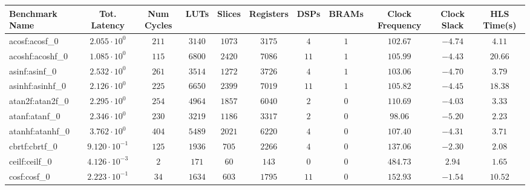 \begin{tabular}{|l|c|c|c|c|c|c|c|c|c|c|}
\hline
Benchmark Name               & Tot. Latency            & Num Cycles & LUTs       & Slices    & Registers  & DSPs    & BRAMs & Clock Frequency & Clock Slack & HLS Time(s) \\
\hline
acosf:acosf\_0               & $ 2.055 \cdot 10^{0}  $ & $ 211    $ & $ 3140   $ & $ 1073  $ & $ 3175   $ & $ 4   $ & $ 1 $ & $ 102.67      $ & $ -4.74   $ & $ 4.11    $ \\
acoshf:acoshf\_0             & $ 1.085 \cdot 10^{0}  $ & $ 115    $ & $ 6800   $ & $ 2420  $ & $ 7086   $ & $ 11  $ & $ 1 $ & $ 105.99      $ & $ -4.43   $ & $ 20.66   $ \\
asinf:asinf\_0               & $ 2.532 \cdot 10^{0}  $ & $ 261    $ & $ 3514   $ & $ 1272  $ & $ 3726   $ & $ 4   $ & $ 1 $ & $ 103.06      $ & $ -4.70   $ & $ 3.79    $ \\
asinhf:asinhf\_0             & $ 2.126 \cdot 10^{0}  $ & $ 225    $ & $ 6650   $ & $ 2399  $ & $ 7019   $ & $ 11  $ & $ 1 $ & $ 105.82      $ & $ -4.45   $ & $ 18.38   $ \\
atan2f:atan2f\_0             & $ 2.295 \cdot 10^{0}  $ & $ 254    $ & $ 4964   $ & $ 1857  $ & $ 6040   $ & $ 2   $ & $ 0 $ & $ 110.69      $ & $ -4.03   $ & $ 3.33    $ \\
atanf:atanf\_0               & $ 2.346 \cdot 10^{0}  $ & $ 230    $ & $ 3219   $ & $ 1186  $ & $ 3317   $ & $ 2   $ & $ 0 $ & $ 98.06       $ & $ -5.20   $ & $ 2.23    $ \\
atanhf:atanhf\_0             & $ 3.762 \cdot 10^{0}  $ & $ 404    $ & $ 5489   $ & $ 2021  $ & $ 6220   $ & $ 4   $ & $ 0 $ & $ 107.40      $ & $ -4.31   $ & $ 3.71    $ \\
cbrtf:cbrtf\_0               & $ 9.120 \cdot 10^{-1} $ & $ 125    $ & $ 1936   $ & $ 705   $ & $ 2266   $ & $ 4   $ & $ 0 $ & $ 137.06      $ & $ -2.30   $ & $ 2.08    $ \\
ceilf:ceilf\_0               & $ 4.126 \cdot 10^{-3} $ & $ 2      $ & $ 171    $ & $ 60    $ & $ 143    $ & $ 0   $ & $ 0 $ & $ 484.73      $ & $ 2.94    $ & $ 1.65    $ \\
cosf:cosf\_0                 & $ 2.223 \cdot 10^{-1} $ & $ 34     $ & $ 1634   $ & $ 603   $ & $ 1795   $ & $ 11  $ & $ 0 $ & $ 152.93      $ & $ -1.54   $ & $ 10.52   $ \\

\end{tabular}
